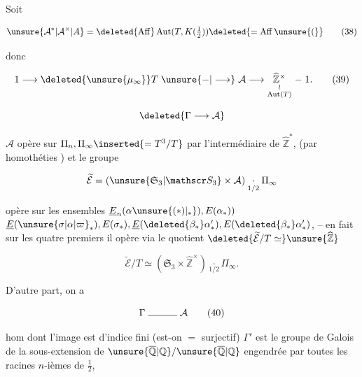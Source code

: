 
Soit

\[
\unsure{\mathcal A^{*}|\mathcal A^{\times}|A}=\deleted{\operatorname{Aff}}\operatorname{Aut}(T,K(\tfrac12))\deleted{=\operatorname{Aff}\unsure{(}}
\tag*{(38)}
\]

donc

\[
1\longrightarrow\deleted{\unsure{\mu_\infty}}T\mathrel{\unsure{-|\longrightarrow}}\mathcal A\longrightarrow
\underset{\substack{\wr\\\operatorname{Aut}(T)}}{\widehat{\mathbb Z}^{\times}}\mathrel{-}1.
\tag*{(39)}
\]


\[
\deleted{\Gamma\longrightarrow\mathcal A}
\]

$\mathcal A$ opère sur $\Pi_n,\Pi_\infty\inserted{=T^3/T}$ par l'intermédiaire de $\widehat{\mathbb Z}^{*}$, (par homothéties  ) et le groupe

\[
\widetilde{\mathcal E}=(\unsure{\mathfrak S_3|\mathscr S_3}\times\mathcal A)\underset{1/2}{\cdot}\Pi_\infty
\]


opère  sur les ensembles $\underline E_n(\alpha\unsure{(*)|{}_*}),E(\alpha_*))$ $\underline E(\unsure{\sigma|\alpha|\varpi}_*),E(\sigma_*),\underline E(\deleted{\beta_*}\alpha'_*),E(\deleted{\beta_*}\alpha'_*)$, -- en fait sur les quatre premiers il opère via le quotient $\deleted{\widetilde{\mathcal E}/T\simeq}\unsure{\widehat{\mathbb Z}}$

\[
\widetilde{\mathcal E}/T\simeq(\mathfrak S_3\times\widehat{\mathbb Z}^{\times})\underset{1/2}{\cdot}\Pi_\infty .
\]

D'autre part, on a

\[
\Gamma\mathrel{\rule{3em}{0.4pt}}\mathcal A
\tag*{(40)}
\]

hom dont l'image  est d'indice fini (est-on $=$ surjectif) $\Gamma'$ est le groupe de Galois de la sous-extension de $\unsure{\overline{\mathbb Q}|\mathbb Q}/\unsure{\overline{\mathbb Q}|\mathbb Q}$ engendrée par toutes les racines $n$-ièmes de $\tfrac12$,


